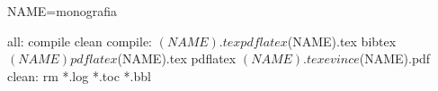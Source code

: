 NAME=monografia

all: compile clean
compile: $(NAME).tex
	pdflatex $(NAME).tex
	bibtex $(NAME)
	pdflatex $(NAME).tex
	pdflatex $(NAME).tex
	evince $(NAME).pdf
clean:
	rm *.log *.toc *.bbl 



